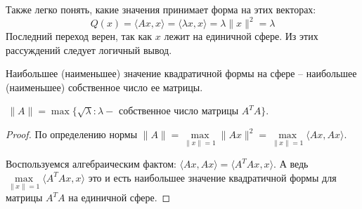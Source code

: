     Также легко понять, какие значения принимает форма на этих векторах: \[ Q(x) = \langle Ax, x \rangle = \langle \lambda x, x \rangle = \lambda \| x \|^2 = \lambda  \]
    Последний переход верен, так как $x$ лежит на единичной сфере.
    Из этих рассуждений следует логичный вывод.

\begin{theorem}
    Наибольшее (наименьшее) значение квадратичной формы на сфере -- наибольшее (наименьшее) собственное число ее матрицы.
\end{theorem}

\vspace*{5mm}

\follow $\, \| A \| = \max \{ \sqrt{\lambda} : \lambda - \text{ собственное число матрицы } A^TA \}$.
\begin{proof}
    По определению нормы $\|A\| = \max\limits_{\|x\| = 1} \|Ax\|^2 = \max\limits_{\|x\| = 1} \langle Ax, Ax \rangle$.
    
    Воспользуемся алгебраическим фактом: $\langle Ax, Ax \rangle = \langle A^TAx, x \rangle$.
    А ведь $\max\limits_{\|x\| = 1} \langle A^TAx, x \rangle$ это и есть наибольшее значение квадратичной формы для матрицы $A^TA$ на единичной сфере.
\end{proof}



